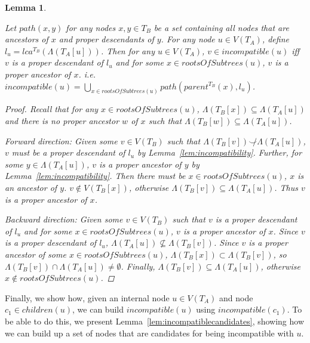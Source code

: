 \documentclass{article}
\newcommand{\compatible}{\smile}
\newcommand{\leafset}{\Lambda}
\newtheorem{incompatibilityrootsofsubtrees}[incompatibility]{Lemma}
\begin{document}
    \begin{incompatibilityrootsofsubtrees}
        \label{lem:incompatibilityrootsofsubtrees}

        Let $path(x, y)$ for any nodes $x, y \in T_B$ be a set containing all nodes that are ancestors of $x$ and proper descendants of $y$. For any node $u \in V(T_A)$, define $l_u = lca^{T_B}(\leafset(T_A[u]))$. Then for any $u \in V(T_A)$, $v \in incompatible(u)$ iff $v$ is a proper descendant of $l_u$ and for some $x \in rootsOfSubtrees(u)$, $v$ is a proper ancestor of $x$. i.e. $incompatible(u) = \bigcup_{x \in rootsOfSubtrees(u)} path(parent^{T_B}(x), l_u)$.

        \begin{proof}
            Recall that for any $x \in rootsOfSubtrees(u)$, $\leafset(T_B[x]) \subseteq \leafset(T_A[u])$ and there is no proper ancestor $w$ of $x$ such that $\leafset(T_B[w]) \subseteq \leafset(T_A[u])$.

            \textit{Forward direction}: Given some $v \in V(T_B)$ such that $\leafset(T_B[v]) \not\compatible \leafset(T_A[u])$, $v$ must be a proper descendant of $l_u$ by Lemma~\ref{lem:incompatibility}. Further, for some $y \in \leafset(T_A[u])$, $v$ is a proper ancestor of $y$ by Lemma~\ref{lem:incompatibility}. Then there must be $x \in rootsOfSubtrees(u)$, $x$ is an ancestor of $y$. $v \not\in V(T_B[x])$, otherwise $\leafset(T_B[v]) \subseteq \leafset(T_A[u])$. Thus $v$ is a proper ancestor of $x$.

            \textit{Backward direction}: Given some $v \in V(T_B)$ such that $v$ is a proper descendant of $l_u$ and for some $x \in rootsOfSubtrees(u)$, $v$ is a proper ancestor of $x$. Since $v$ is a proper descendant of $l_u$, $\leafset(T_A[u]) \not\subseteq \leafset(T_B[v])$. Since $v$ is a proper ancestor of some $x \in rootsOfSubtrees(u)$, $\leafset(T_B[x]) \subset \leafset(T_B[v])$, so $\leafset(T_B[v]) \cap \leafset(T_A[u]) \neq \emptyset$. Finally, $\leafset(T_B[v]) \subseteq \leafset(T_A[u])$, otherwise $x \not\in rootsOfSubtrees(u)$.
        \end{proof}
    \end{incompatibilityrootsofsubtrees}

    Finally, we show how, given an internal node $u \in V(T_A)$ and node $c_1 \in children(u)$, we can build $incompatible(u)$ using $incompatible(c_1)$. To be able to do this, we present Lemma~\ref{lem:incompatiblecandidates}, showing how we can build up a set of nodes that are candidates for being incompatible with $u$.
\end{document}
